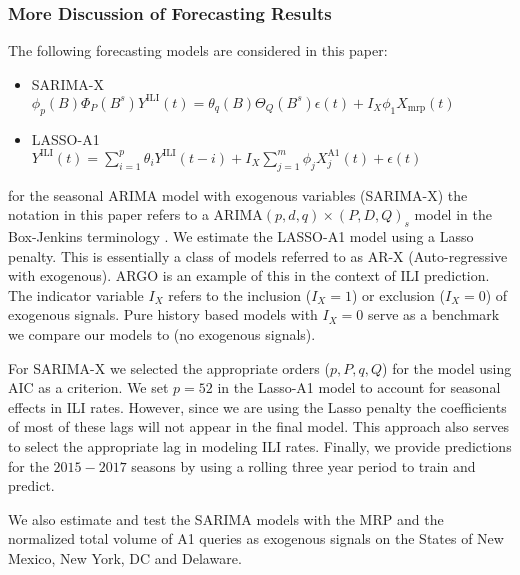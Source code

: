 \documentclass[12pt]{article}
\begin{document}


\subsubsection{More Discussion of Forecasting Results}

The following forecasting models are considered in this paper:
\begin{itemize}
\item SARIMA-X \\
$\phi_p(B)\Phi_P(B^s)Y^{\text{ILI}}(t) =  \theta_q(B)\Theta_Q(B^s)\epsilon(t) + I_X\phi_1 X_{\text{mrp}}(t)$
\item LASSO-A1 \\
$Y^{\text{ILI}}(t) = \sum_{i=1}^p \theta_i Y^{\text{ILI}}(t-i) +  I_X\sum_{j=1}^m \phi_j X_j^{\text{A1}}(t) + \epsilon(t)$
\end{itemize}

for the seasonal ARIMA model with exogenous variables (SARIMA-X) the notation in this paper refers to a ARIMA$(p,d,q)\times(P,D,Q)_s$ model in the Box-Jenkins terminology \citep{box_etal_2015}. We estimate the LASSO-A1 model using a Lasso penalty. This is essentially a class of models referred to as AR-X (Auto-regressive with exogenous). ARGO \cite{yang_etal_2015inference, yang_etal_2015} is an example of this in the context of ILI prediction. The indicator variable $I_X$ refers to the inclusion ($I_X=1$) or exclusion ($I_X=0$) of exogenous signals. Pure history based models with $I_X=0$ serve as a benchmark we compare our models to (no exogenous signals). 

For SARIMA-X we selected the appropriate orders ($p,P,q,Q$) for the model using AIC as a criterion. We set $p=52$ in the Lasso-A1 model to account for seasonal effects in ILI rates. However, since we are using the Lasso penalty the coefficients of most of these lags will not appear in the final model. This approach also serves to select the appropriate lag in modeling ILI rates. Finally, we provide predictions for the $2015-2017$ seasons by using a rolling three year period to train and predict.

We also estimate and test the SARIMA models with the MRP and the normalized total volume of A1 queries as exogenous signals on the States of New Mexico, New York, DC and Delaware. 
\end{document}
